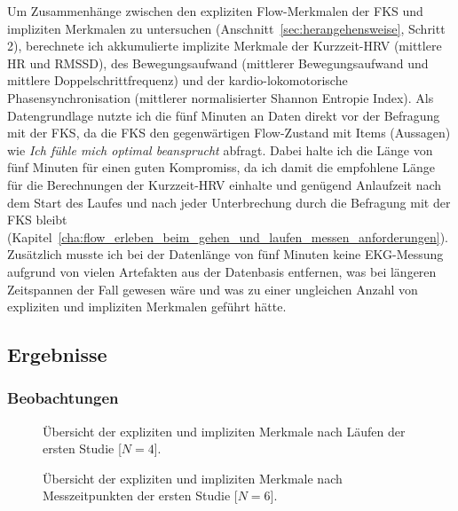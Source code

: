 Um Zusammenhänge zwischen den expliziten Flow-Merkmalen der \ac{FKS} und impliziten Merkmalen zu untersuchen (Anschnitt~\ref{sec:herangehensweise}, Schritt 2), berechnete ich akkumulierte implizite Merkmale der Kurzzeit-\ac{HRV} (mittlere \ac{HR} und \acs{RMSSD}), des Bewegungsaufwand (mittlerer Bewegungsaufwand und mittlere Doppelschrittfrequenz) und der kardio-lokomotorische Phasensynchronisation (mittlerer normalisierter Shannon Entropie Index). Als Datengrundlage nutzte ich die fünf Minuten an Daten direkt vor der Befragung mit der \ac{FKS}, da die \ac{FKS} den gegenwärtigen Flow-Zustand mit Items (Aussagen) wie \emph{Ich fühle mich optimal beansprucht} abfragt. Dabei halte ich die Länge von fünf Minuten für einen guten Kompromiss, da ich damit die empfohlene Länge für die Berechnungen der Kurzzeit-\ac{HRV} \citep[][S.~360]{TaskForce1996} einhalte und genügend Anlaufzeit nach dem Start des Laufes und nach jeder Unterbrechung durch die Befragung mit der \ac{FKS} bleibt (Kapitel~\ref{cha:flow_erleben_beim_gehen_und_laufen_messen_anforderungen}). Zusätzlich musste ich bei der Datenlänge von fünf Minuten keine \ac{EKG}-Messung aufgrund von vielen Artefakten aus der Datenbasis entfernen, was bei längeren Zeitspannen der Fall gewesen wäre und was zu einer ungleichen Anzahl von expliziten und impliziten Merkmalen geführt hätte.

\subsection{Ergebnisse} 

\label{sub:ergebnisse_5_1}

\subsubsection{Beobachtungen} 

\label{ssub:beobachtungen_5_1} 
\begin{figure}
	[!htb]  \caption[Übersicht der expliziten und impliziten Merkmale nach Läufen (Erste Studie: Laufen)]{Übersicht der expliziten und impliziten Merkmale nach Läufen der ersten Studie [$N = 4$].} \label{fig:ubersicht_nach_laufen_1} 
\end{figure}
\begin{figure}
	[!htb]  \caption[Übersicht der expliziten und impliziten Merkmale nach Messzeitpunkten (Erste Studie: Laufen)]{Übersicht der expliziten und impliziten Merkmale nach Messzeitpunkten der ersten Studie [$N = 6$].} \label{fig:ubersicht_nach_messzeitpunkten_1} 
\end{figure}

